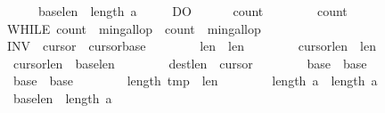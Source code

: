\begin{isabellebody}
\ \ \ \ \ \ \ \ \ \ \ {\isacharparenleft}\isactrlbsup {\isasymsigma}\isactrlesup base{}{\isacharplus}\isactrlbsup {\isasymsigma}\isactrlesup len{}\ {\isasymle}\ length\ \isactrlbsup {\isasymsigma}\isactrlesup a{\isacharparenright}\ {\isasymrbrace}\isanewline
\ \ \ \ DO\isanewline
\ \ \ \ \ \ {\isasymacute}count{}\ {\isacharcolon}{\isacharequal}{\isacharequal}\ {}{\isacharsemicolon}{\isacharsemicolon}\isanewline
\ \ \ \ \ \ {\isasymacute}count{}\ {\isacharcolon}{\isacharequal}{\isacharequal}\ {}{\isacharsemicolon}{\isacharsemicolon}\isanewline
\ \ \ \ \ \ WHILE\ {\isacharparenleft}{\isasymacute}count{}\ {\isacharless}\ {\isasymacute}min{\isacharunderscore}gallop\ {\isacharampersand}\ {\isasymacute}count{}\ {\isacharless}\ {\isasymacute}min{\isacharunderscore}gallop{\isacharparenright}\isanewline
\ \ \ \ \ \ INV\ {\isasymlbrace}\ {\isasymacute}cursor{}{\isasymge}{}\ {\isasymand}\ {\isasymacute}cursor{}{\isasymge}{\isasymacute}base{}\ {\isasymand}\isanewline
\ \ \ \ \ \ \ {\isasymacute}len{}{\isachargreater}{}\ {\isasymand}\ {\isasymacute}len{}{\isachargreater}{}\ {\isasymand}\isanewline
\ \ \ \ \ \ \ {\isasymacute}cursor{}{\isacharplus}{\isasymacute}len{}\ {\isacharequal}\ \isactrlbsup {\isasymsigma}\isactrlesup len{}\ {\isasymand}\isanewline
\ \ \ \ \ \ \ {\isasymacute}cursor{}{\isacharplus}{\isasymacute}len{}\ {\isacharequal}\ {\isasymacute}base{}{\isacharplus}\isactrlbsup {\isasymsigma}\isactrlesup len{}\ {\isasymand}\isanewline
\ \ \ \ \ \ \ {\isasymacute}dest{\isacharplus}{\isasymacute}len{}\ {\isacharequal}\ {\isasymacute}cursor{}\ {\isasymand}\isanewline
\ \ \ \ \ \ \ {\isasymacute}base{}\ {\isacharequal}\ \isactrlbsup {\isasymsigma}\isactrlesup base{}\ {\isasymand}\isanewline
\ \ \ \ \ \ \ {\isasymacute}base{}\ {\isacharequal}\ \isactrlbsup {\isasymsigma}\isactrlesup base{}\ {\isasymand}\isanewline
\ \ \ \ \ \ \ length\ {\isasymacute}tmp\ {\isacharequal}\ \isactrlbsup {\isasymsigma}\isactrlesup len{}\ {\isasymand}\isanewline
\ \ \ \ \ \ \ length\ {\isasymacute}a\ {\isacharequal}\ length\ \isactrlbsup {\isasymsigma}\isactrlesup a\ {\isasymand}\isanewline
\ \ \ \ \ \ \ {\isacharparenleft}\isactrlbsup {\isasymsigma}\isactrlesup base{}{\isacharplus}\isactrlbsup {\isasymsigma}\isactrlesup len{}\ {\isasymle}\ length\ \isactrlbsup {\isasymsigma}\isactrlesup a{\isacharparenright}\ {\isasymrbrace}\isanewline

\end{isabellebody}
